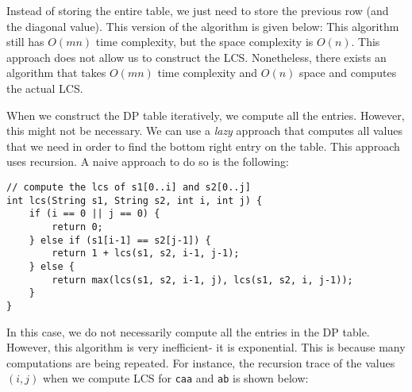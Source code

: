 \documentclass[a4paper, openany]{memoir}
\begin{document}
    Instead of storing the entire table, we just need to store the previous row (and the diagonal value). This version of the algorithm is given below:
    This algorithm still has $O(mn)$ time complexity, but the space complexity is $O(n)$. This approach does not allow us to construct the LCS. Nonetheless, there exists an algorithm that takes $O(mn)$ time complexity and $O(n)$ space and computes the actual LCS.
    
    When we construct the DP table iteratively, we compute all the entries. However, this might not be necessary. We can use a \emph{lazy} approach that computes all values that we need in order to find the bottom right entry on the table. This approach uses recursion. A naive approach to do so is the following:
\begin{lstlisting}[language=pseudocode]
// compute the lcs of s1[0..i] and s2[0..j]
int lcs(String s1, String s2, int i, int j) {
    if (i == 0 || j == 0) {
        return 0;
    } else if (s1[i-1] == s2[j-1]) {
        return 1 + lcs(s1, s2, i-1, j-1);
    } else {
        return max(lcs(s1, s2, i-1, j), lcs(s1, s2, i, j-1));
    }
}
\end{lstlisting}
    In this case, we do not necessarily compute all the entries in the DP table. However, this algorithm is very inefficient- it is exponential. This is because many computations are being repeated. For instance, the recursion trace of the values $(i, j)$ when we compute LCS for \texttt{caa} and \texttt{ab} is shown below:
    \begin{figure}[H]
        \centering
    \end{figure}
\end{document}
